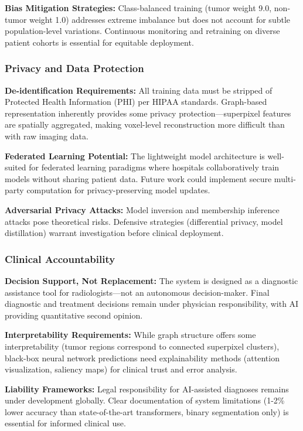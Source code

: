 \documentclass{article}
\begin{document}
\textbf{Bias Mitigation Strategies:} Class-balanced training (tumor weight 9.0, non-tumor weight 1.0) addresses extreme imbalance but does not account for subtle population-level variations. Continuous monitoring and retraining on diverse patient cohorts is essential for equitable deployment.

\subsubsection{Privacy and Data Protection}

\textbf{De-identification Requirements:} All training data must be stripped of Protected Health Information (PHI) per HIPAA standards. Graph-based representation inherently provides some privacy protection—superpixel features are spatially aggregated, making voxel-level reconstruction more difficult than with raw imaging data.

\textbf{Federated Learning Potential:} The lightweight model architecture is well-suited for federated learning paradigms where hospitals collaboratively train models without sharing patient data. Future work could implement secure multi-party computation for privacy-preserving model updates.

\textbf{Adversarial Privacy Attacks:} Model inversion and membership inference attacks pose theoretical risks. Defensive strategies (differential privacy, model distillation) warrant investigation before clinical deployment.

\subsubsection{Clinical Accountability}

\textbf{Decision Support, Not Replacement:} The system is designed as a diagnostic assistance tool for radiologists—not an autonomous decision-maker. Final diagnostic and treatment decisions remain under physician responsibility, with AI providing quantitative second opinion.

\textbf{Interpretability Requirements:} While graph structure offers some interpretability (tumor regions correspond to connected superpixel clusters), black-box neural network predictions need explainability methods (attention visualization, saliency maps) for clinical trust and error analysis.

\textbf{Liability Frameworks:} Legal responsibility for AI-assisted diagnoses remains under development globally. Clear documentation of system limitations (1-2\% lower accuracy than state-of-the-art transformers, binary segmentation only) is essential for informed clinical use.
\end{document}

